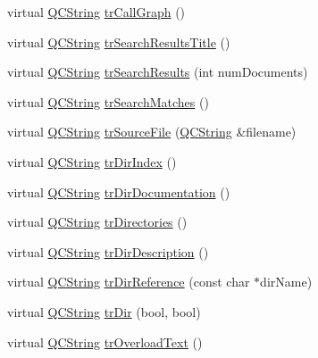 \begin{DoxyCompactItemize}
\item 
virtual \mbox{\hyperlink{class_q_c_string}{Q\+C\+String}} \mbox{\hyperlink{class_translator_chinesetraditional_a618b1ac3e4855df1ae6c15c49a79d64c}{tr\+Call\+Graph}} ()
\item 
virtual \mbox{\hyperlink{class_q_c_string}{Q\+C\+String}} \mbox{\hyperlink{class_translator_chinesetraditional_ad8c097af58cce68a9c3eb92788ea5750}{tr\+Search\+Results\+Title}} ()
\item 
virtual \mbox{\hyperlink{class_q_c_string}{Q\+C\+String}} \mbox{\hyperlink{class_translator_chinesetraditional_a2edcc9f96cb11de3b749f8cbb55bf159}{tr\+Search\+Results}} (int num\+Documents)
\item 
virtual \mbox{\hyperlink{class_q_c_string}{Q\+C\+String}} \mbox{\hyperlink{class_translator_chinesetraditional_a4be8eccb74260c7d8fd07045bc1ec135}{tr\+Search\+Matches}} ()
\item 
virtual \mbox{\hyperlink{class_q_c_string}{Q\+C\+String}} \mbox{\hyperlink{class_translator_chinesetraditional_aead901c951de5396b578db9364fc45b4}{tr\+Source\+File}} (\mbox{\hyperlink{class_q_c_string}{Q\+C\+String}} \&filename)
\item 
virtual \mbox{\hyperlink{class_q_c_string}{Q\+C\+String}} \mbox{\hyperlink{class_translator_chinesetraditional_a23a47a7d90fd4f1c79b1f89ad851a2fd}{tr\+Dir\+Index}} ()
\item 
virtual \mbox{\hyperlink{class_q_c_string}{Q\+C\+String}} \mbox{\hyperlink{class_translator_chinesetraditional_a963d993d8ff90c7c31418a6619587786}{tr\+Dir\+Documentation}} ()
\item 
virtual \mbox{\hyperlink{class_q_c_string}{Q\+C\+String}} \mbox{\hyperlink{class_translator_chinesetraditional_a7d0523cee408b8a61b6805765ef58965}{tr\+Directories}} ()
\item 
virtual \mbox{\hyperlink{class_q_c_string}{Q\+C\+String}} \mbox{\hyperlink{class_translator_chinesetraditional_aee48759aa26beb5da06054ce369b664e}{tr\+Dir\+Description}} ()
\item 
virtual \mbox{\hyperlink{class_q_c_string}{Q\+C\+String}} \mbox{\hyperlink{class_translator_chinesetraditional_af0b29374505eb9f3e3fc38c766c122a9}{tr\+Dir\+Reference}} (const char $\ast$dir\+Name)
\item 
virtual \mbox{\hyperlink{class_q_c_string}{Q\+C\+String}} \mbox{\hyperlink{class_translator_chinesetraditional_aa58d8becc977f4dc7fc422c93f124f92}{tr\+Dir}} (bool, bool)
\item 
virtual \mbox{\hyperlink{class_q_c_string}{Q\+C\+String}} \mbox{\hyperlink{class_translator_chinesetraditional_ab1da30c765db6204b17c0f406692caa8}{tr\+Overload\+Text}} ()

\end{DoxyCompactItemize}
